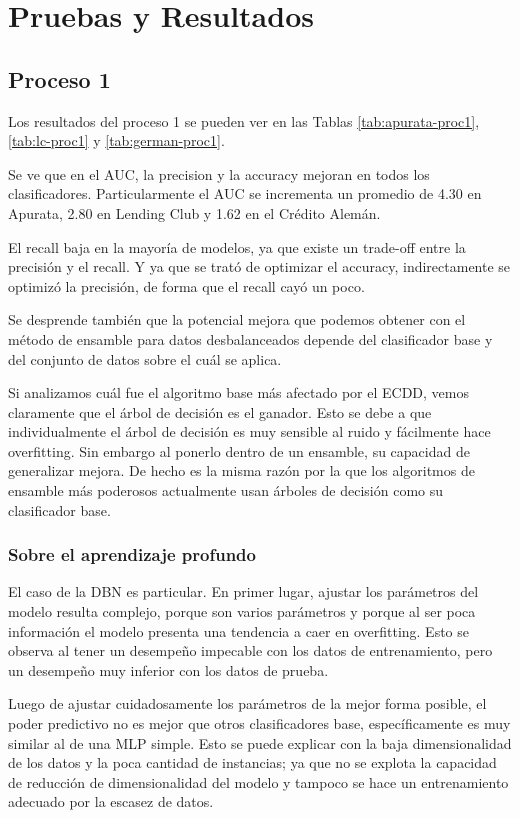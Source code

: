 \chapter{Pruebas y Resultados}

\section{Proceso 1} %

Los resultados del proceso 1 se pueden ver en las Tablas \ref{tab:apurata-proc1}, \ref{tab:lc-proc1} y \ref{tab:german-proc1}.

Se ve que en el AUC, la precision y la accuracy mejoran en todos los clasificadores. Particularmente el AUC se incrementa un promedio de 4.30 en Apurata, 2.80 en Lending Club y 1.62 en el Crédito Alemán.

El recall baja en la mayoría de modelos, ya que existe un trade-off entre la precisión y el recall. Y ya que se trató de optimizar el accuracy, indirectamente se optimizó la precisión, de forma que el recall cayó un poco.

Se desprende también que la potencial mejora que podemos obtener con el método de ensamble para datos desbalanceados depende del clasificador base y del conjunto de datos sobre el cuál se aplica. 

Si analizamos cuál fue el algoritmo base más afectado por el \ac{ECDD}, vemos claramente que el árbol de decisión es el ganador. Esto se debe a que individualmente el árbol de decisión es muy sensible al ruido y fácilmente hace overfitting. Sin embargo al ponerlo dentro de un ensamble, su capacidad de generalizar mejora. De hecho es la misma razón por la que los algoritmos de ensamble más poderosos actualmente usan árboles de decisión como su clasificador base.

\subsection{Sobre el aprendizaje profundo}

El caso de la \ac{DBN} es particular. En primer lugar, ajustar los parámetros del modelo resulta complejo, porque son varios parámetros y porque al ser poca información el modelo presenta una tendencia a caer en overfitting. Esto se observa al tener un desempeño impecable con los datos de entrenamiento, pero un desempeño muy inferior con los datos de prueba.

Luego de ajustar cuidadosamente los parámetros de la mejor forma posible, el poder predictivo no es mejor que otros clasificadores base, específicamente es muy similar al de una \ac{MLP} simple. Esto se puede explicar con la baja dimensionalidad de los datos y la poca cantidad de instancias; ya que no se explota la capacidad de reducción de dimensionalidad del modelo y tampoco se hace un entrenamiento adecuado por la escasez de datos.

